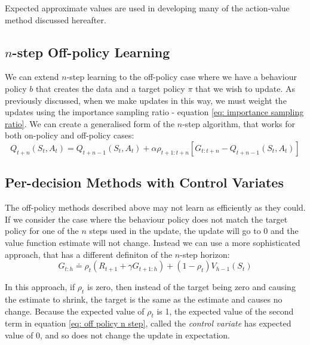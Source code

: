 Expected approximate values are used in developing many of the action-value method discussed hereafter. 

\subsection{$n$-step Off-policy Learning}
We can extend $n$-step learning to the off-policy case where we have a behaviour policy $b$ that creates the data and a target policy $\pi$ that we wish to update. As previously discussed, when we make updates in this way, we must weight the updates using the importance sampling ratio - equation \ref{eq: importance sampling ratio}. We can create a generalised form of the $n$-step algorithm, that works for both on-policy and off-policy cases:
\begin{equation}
Q_{t+n}(S_t, A_t) = Q_{t+n-1}(S_t, A_t) + \alpha \rho_{t+1:t+n} \left[G_{t:t+n} - Q_{t+n-1}(S_t, A_t)\right]
\end{equation}

\subsection{Per-decision Methods with Control Variates}
The off-policy methods described above may not learn as efficiently as they could. If we consider the case where the behaviour policy does not match the target policy for one of the $n$ steps used in the update, the update will go to 0 and the value function estimate will not change. Instead we can use a more sophisticated approach, that has a different definiton of the $n$-step horizon:
\begin{equation} \label{eq: off policy n step}
G_{t:h} \doteq \rho_t (R_{t+1} + \gamma G_{t+1:h}) + (1 - \rho_t)V_{h-1}(S_t)
\end{equation}

In this approach, if $\rho_t$ is zero, then instead of the target being zero and causing the estimate to shrink, the target is the same as the estimate and causes no change. Because the expected value of $\rho_t$ is 1, the expected value of the second term in equation \ref{eq: off policy n step}, called the \textit{control variate} has expected value of 0, and so does not change the update in expectation.


